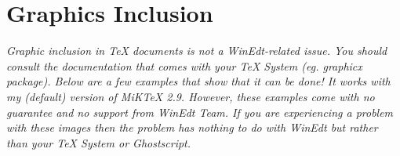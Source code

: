 \documentclass{article}
\begin{document}
\section{Graphics Inclusion}

\emph{Graphic inclusion in TeX documents is not a WinEdt-related issue. You
should consult the documentation that comes with your TeX System (eg.
graphicx package). Below are a few examples that show that it can be done! It
works with my (default) version of MiKTeX 2.9. However, these examples come
with no guarantee and no support from WinEdt Team. If you are experiencing a
problem with these images then the problem has nothing to do with WinEdt but
rather than your TeX System or Ghostscript.}

\end{document}
